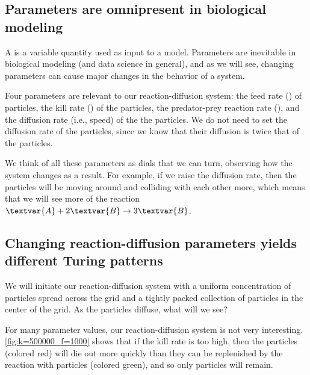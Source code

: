 \subsection{Parameters are omnipresent in biological modeling}

A  is a variable quantity used as input to a model. Parameters are inevitable in biological modeling (and data science in general), and as we will see, changing parameters can cause major changes in the behavior of a system.

Four parameters are relevant to our reaction-diffusion system: the feed rate () of  particles, the kill rate () of the  particles, the predator-prey reaction rate (), and the diffusion rate (i.e., speed) of the the  particles. We do not need to set the diffusion rate of the  particles, since we know that their diffusion is twice that of the  particles.

We think of all these parameters as dials that we can turn, observing how the system changes as a result. For example, if we raise the diffusion rate, then the particles will be moving around and colliding with each other more, which means that we will see more of the reaction $\textvar{A} + 2\textvar{B} \rightarrow 3\textvar{B}$.\\

\begin{qbox}\end{qbox}

\FloatBarrier
{}
\subsection{Changing reaction-diffusion parameters yields different Turing patterns}

We will initiate our reaction-diffusion system with a uniform concentration of  particles spread across the grid and a tightly packed collection of  particles in the center of the grid. As the  particles diffuse, what will we see?

For many parameter values, our reaction-diffusion system is not very interesting. \autoref{fig:k=500000_f=1000} shows that if the kill rate is too high, then the  particles (colored red) will die out more quickly than they can be replenished by the reaction with  particles (colored green), and so only  particles will remain.

